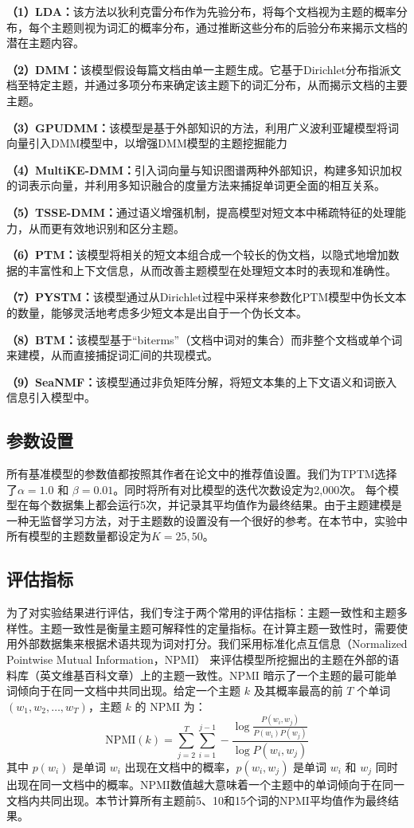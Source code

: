 \textbf{（1）LDA\cite{LDA}：}该方法以狄利克雷分布作为先验分布，将每个文档视为主题的概率分布，每个主题则视为词汇的概率分布，通过推断这些分布的后验分布来揭示文档的潜在主题内容。

\textbf{（2）DMM\cite{GSDMM}：}该模型假设每篇文档由单一主题生成。它基于Dirichlet分布指派文档至特定主题，并通过多项分布来确定该主题下的词汇分布，从而揭示文档的主要主题。

\textbf{（3）GPUDMM\cite{GPUDMM}：}该模型是基于外部知识的方法，利用广义波利亚罐模型将词向量引入DMM模型中，以增强DMM模型的主题挖掘能力

\textbf{（4）MultiKE-DMM\cite{MKEDMM}：}引入词向量与知识图谱两种外部知识，构建多知识加权的词表示向量，并利用多知识融合的度量方法来捕捉单词更全面的相互关系。

\textbf{（5）TSSE-DMM\cite{TSSE}：}通过语义增强机制，提高模型对短文本中稀疏特征的处理能力，从而更有效地识别和区分主题。

\textbf{（6）PTM\cite{PTM}：}该模型将相关的短文本组合成一个较长的伪文档，以隐式地增加数据的丰富性和上下文信息，从而改善主题模型在处理短文本时的表现和准确性。

\textbf{（7）PYSTM\cite{PYSTM}：}该模型通过从Dirichlet过程中采样来参数化PTM模型中伪长文本的数量，能够灵活地考虑多少短文本是出自于一个伪长文本。

\textbf{（8）BTM\cite{BTM}：}该模型基于“biterms”（文档中词对的集合）而非整个文档或单个词来建模，从而直接捕捉词汇间的共现模式。

\textbf{（9）SeaNMF\cite{SeaNMF}：}该模型通过非负矩阵分解，将短文本集的上下文语义和词嵌入信息引入模型中。

\subsection{参数设置}
所有基准模型的参数值都按照其作者在论文中的推荐值设置。我们为TPTM选择了$\alpha=1.0$ 和 $\beta=0.01$。同时将所有对比模型的迭代次数设定为2,000次。 每个模型在每个数据集上都会运行5次，并记录其平均值作为最终结果。由于主题建模是一种无监督学习方法，对于主题数的设置没有一个很好的参考。在本节中，实验中所有模型的主题数量都设定为$K=25, 50$。

\subsection{评估指标}
为了对实验结果进行评估，我们专注于两个常用的评估指标：主题一致性和主题多样性。主题一致性是衡量主题可解释性的定量指标。在计算主题一致性时，需要使用外部数据集来根据术语共现为词对打分。我们采用标准化点互信息（Normalized Pointwise Mutual Information，NPMI）\cite{coherence} 来评估模型所挖掘出的主题在外部的语料库（英文维基百科文章）上的主题一致性。NPMI 暗示了一个主题的最可能单词倾向于在同一文档中共同出现。给定一个主题 $k$ 及其概率最高的前 $T$ 个单词 $(w_1,w_2,\dots,w_T)$，主题 $k$ 的 NPMI 为：
\begin{equation}
    \mbox{NPMI}(k)=\sum_{j=2}^T\sum_{i=1}^{j-1}-\frac{\log\frac{P(w_i,w_j)}{P(w_i)P(w_j)}}{\log P(w_i,w_j)}
 \end{equation}
其中 $p(w_i)$ 是单词 $w_i$ 出现在文档中的概率，$p(w_i,w_j)$ 是单词 $w_i$ 和 $w_j$ 同时出现在同一文档中的概率。NPMI数值越大意味着一个主题中的单词倾向于在同一文档内共同出现。本节计算所有主题前5、10和15个词的NPMI平均值作为最终结果。

